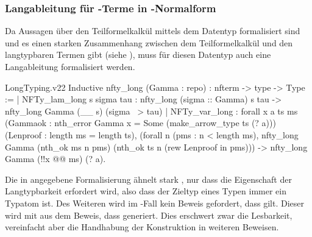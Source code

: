 \subsubsection{Langableitung für \tlambda-Terme in \tbeta-Normalform}
Da Aussagen über den Teilformelkalkül mittels dem Datentyp  formalisiert sind und es einen starken Zusammenhang zwischen dem Teilformelkalkül und den langtypbaren Termen gibt (siehe ), muss für diesen Datentyp auch eine Langableitung formalisiert werden.
\begin{code}{LongTyping.v}{}{22}
Inductive nfty_long (Gamma : repo) : nfterm -> type -> Type :=
  | NFTy_lam_long s sigma tau : 
      nfty_long (sigma :: Gamma) s tau -> 
        nfty_long Gamma (\__ s) (sigma ~> tau)
  | NFTy_var_long :  forall x a ts ms 
      (Gammaok : nth_error Gamma x = 
          Some (make_arrow_type ts (? a)))
      (Lenproof : length ms = length ts),
        (forall n (pms : n < length ms),
          nfty_long Gamma (nth_ok ms n pms) 
            (nth_ok ts n (rew Lenproof in pms))) ->
              nfty_long Gamma (!!x @@ ms) (? a).
\end{code}
Die in  angegebene Formalisierung ähnelt stark , nur dass die Eigenschaft der Langtypbarkeit erfordert wird, also dass der Zieltyp eines Typen immer ein Typatom ist. Des Weiteren wird im -Fall kein Beweis gefordert, dass  gilt. Dieser wird mit  aus dem Beweis, dass  generiert. Dies erschwert zwar die Lesbarkeit, vereinfacht aber die Handhabung der Konstruktion in weiteren Beweisen.


